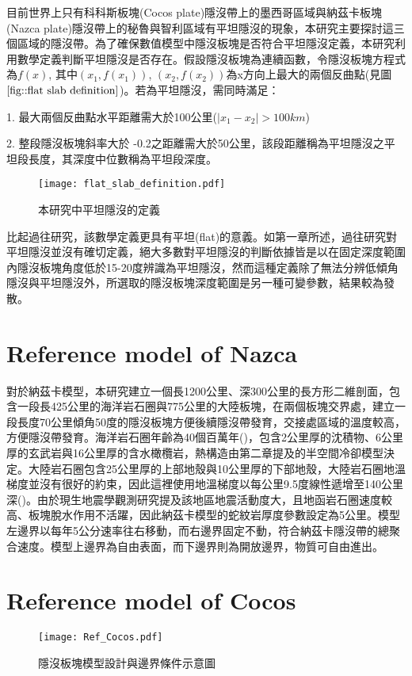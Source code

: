 目前世界上只有科科斯板塊(Cocos plate)隱沒帶上的墨西哥區域與納茲卡板塊(Nazca plate)隱沒帶上的秘魯與智利區域有平坦隱沒的現象，本研究主要探討這三個區域的隱沒帶。為了確保數值模型中隱沒板塊是否符合平坦隱沒定義，本研究利用數學定義判斷平坦隱沒是否存在。假設隱沒板塊為連續函數，令隱沒板塊方程式為$f(x)$, 其中$(x_{1},f(x_{1}))$, $(x_{2},f(x_{2}))$為x方向上最大的兩個反曲點(見圖$\ref{fig::flat slab definition}$)。若為平坦隱沒，需同時滿足：

1. 最大兩個反曲點水平距離需大於100公里($\mid x_{1}-x_{2}\mid > 100 km$)

2. 整段隱沒板塊斜率大於 -0.2之距離需大於50公里，該段距離稱為平坦隱沒之平坦段長度，其深度中位數稱為平坦段深度。

\begin{figure*}[ht!]
    \centering
    \texttt{[image: flat\_slab\_definition.pdf]}
    \caption{本研究中平坦隱沒的定義}
    \label{fig::flat slab definition}
\end{figure*}


比起過往研究，該數學定義更具有平坦(flat)的意義。如第一章所述，過往研究對平坦隱沒並沒有確切定義，絕大多數對平坦隱沒的判斷依據皆是以在固定深度範圍內隱沒板塊角度低於15-20度辨識為平坦隱沒，然而這種定義除了無法分辨低傾角隱沒與平坦隱沒外，所選取的隱沒板塊深度範圍是另一種可變參數，結果較為發散。

\section{Reference model of Nazca}

對於納茲卡模型，本研究建立一個長1200公里、深300公里的長方形二維剖面，包含一段長425公里的海洋岩石圈與775公里的大陸板塊，在兩個板塊交界處，建立一段長度70公里傾角50度的隱沒板塊方便後續隱沒帶發育，交接處區域的溫度較高，方便隱沒帶發育。海洋岩石圈年齡為40個百萬年(\citealp{muller2019})，包含2公里厚的沈積物、6公里厚的玄武岩與16公里厚的含水橄欖岩，熱構造由第二章提及的半空間冷卻模型決定。大陸岩石圈包含25公里厚的上部地殼與10公里厚的下部地殼，大陸岩石圈地溫梯度並沒有很好的約束，因此這裡使用地溫梯度以每公里9.5度線性遞增至140公里深(\citealp{perez2008})。由於現生地震學觀測研究提及該地區地震活動度大，且地函岩石圈速度較高、板塊脫水作用不活躍，因此納茲卡模型的蛇紋岩厚度參數設定為5公里。模型左邊界以每年5公分速率往右移動，而右邊界固定不動，符合納茲卡隱沒帶的總聚合速度。模型上邊界為自由表面，而下邊界則為開放邊界，物質可自由進出。





\section{Reference model of Cocos}


\begin{figure*}[ht!]
    \centering
    \texttt{[image: Ref\_Cocos.pdf]}
    \caption{隱沒板塊模型設計與邊界條件示意圖}
    \label{fig::reference Cocos model}
\end{figure*}